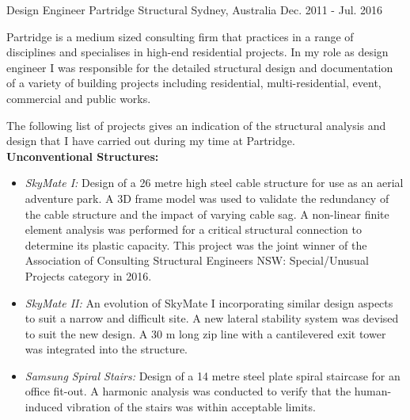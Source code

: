 

\begin{cventries}

  \cventry
    {Design Engineer} %
    {Partridge Structural} %
    {Sydney, Australia} %
    {Dec. 2011 - Jul. 2016} %
    {
      \begin{cvitems} %
        \item {Partridge is a medium sized consulting firm that practices in a range of disciplines and specialises in high-end residential projects. In my role as design engineer I was responsible for the detailed structural design and documentation of a variety of building projects including residential, multi-residential, event, commercial and public works.}
        \item {The following list of projects gives an indication of the structural analysis and design that I have carried out during my time at Partridge.}\\
        \textbf{Unconventional Structures:}
          \begin{itemize}
            \item \emph{SkyMate I:} Design of a 26 metre high steel cable structure for use as an aerial adventure park. A 3D frame model was used to validate the redundancy of the cable structure and the impact of varying cable sag. A non-linear finite element analysis was performed for a critical structural connection to determine its plastic capacity. This project was the joint winner of the Association of Consulting Structural Engineers NSW: Special/Unusual Projects category in 2016.
            \item \emph{SkyMate II:} An evolution of SkyMate I incorporating similar design aspects to suit a narrow and difficult site. A new lateral stability system was devised to suit the new design. A 30 m long zip line with a cantilevered exit tower was integrated into the structure.
            \item \emph{Samsung Spiral Stairs:} Design of a 14 metre steel plate spiral staircase for an office fit-out. A harmonic analysis was conducted to verify that the human-induced vibration of the stairs was within acceptable limits.

\end{itemize}
\end{cvitems}}
\end{cventries}
